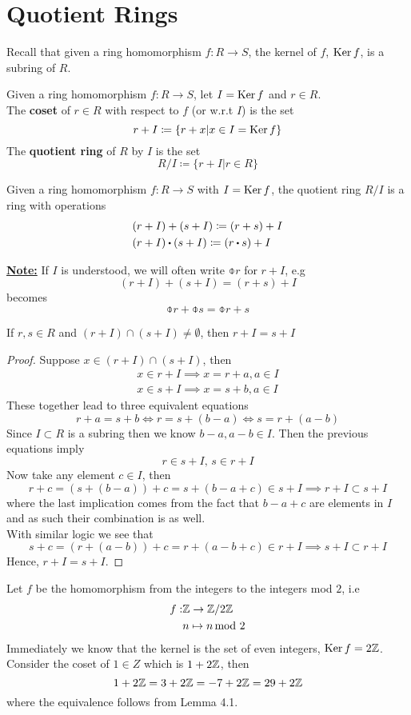 \documentclass[../Main.tex]{subfiles}
\begin{document}
\chapter{Quotient Rings}
Recall that given a ring homomorphism $f: R\to S$, the kernel of $f$, $\operatorname{Ker} f$, is a subring of $R$.
\begin{dfn}[title= Coset and Quotient Ring]
	Given a ring homomorphism $f:R\to S$, let $I= \operatorname{Ker} f$ and $r\in R$.\\
	The \textbf{coset} of $r \in R$ with respect to $f$ (or w.r.t $I$) is the set
	\[r+I \coloneqq \{r+x|x\in I = \operatorname{Ker} f\}\]
	The \textbf{quotient ring} of $R$ by $I$ is the set
	\[R/I\coloneqq \{r+I|r\in R\}\]
\end{dfn}
\begin{prop}[title= Coset space is a ring]
	Given a ring homomorphism $f: R \to S$ with $I = \operatorname{Ker} f$, the quotient ring $R/I$ is a ring with operations
	\begin{align*}
		&(r+I)+(s+I)\coloneqq (r+s)+I\\
		&(r+I)\rdot (s+I)\coloneqq (r\rdot s)+I
	\end{align*}
\end{prop}
\underline{\textbf{Note:}} If $I$ is understood, we will often write $\obar{r}$ for $r+I$, e.g
\[(r+I)+(s+I)=(r+s)+I\]
becomes
\[\obar{r}+\obar{s}=\obar{r+s}\]
\begin{lem}
	If $r,s\in R$ and $(r+I)\cap(s+I)\ne \emptyset$, then $r+I=s+I$
\end{lem}
\begin{proof}
	Suppose $x\in (r+I)\cap (s+I)$, then
	\begin{align*}
		x\in r+I \implies x = r+a, a\in I\\
		x\in s+I \implies x = s+b, a\in I
	\end{align*}
	These together lead to three equivalent equations
	\[r+a = s+b \Longleftrightarrow r=s+(b-a) \Longleftrightarrow s=r+(a-b)\]
	Since $I\subset R$ is a subring then we know $b-a,a-b\in I$. Then the previous equations imply
	\[r\in s+I,\, s\in r+I\]
	Now take any element $c\in I$, then
	\[r+c=(s+(b-a))+c=s+(b-a+c)\in s+I\implies r+I \subset s+I\]
	where the last implication comes from the fact that $b-a+c$ are elements in $I$ and as such their combination is as well.\\
	With similar logic we see that
	\[s+c=(r+(a-b))+c=r+(a-b+c) \in r+I \implies s+I \subset r+I\]
	Hence, $r+I=s+I$.
\end{proof}
\begin{example}
	Let $f$ be the homomorphism from the integers to the integers mod $2$, i.e
	\begin{align*}
		f:&\mathbb{Z} \to \mathbb{Z}/2\mathbb{Z} \\
		&n\mapsto n\,\text{mod }2 
	\end{align*}
	Immediately we know that the kernel is the set of even integers, $\operatorname{Ker} f = 2\mathbb{Z}$.\\
	Consider the coset of $1\in Z$ which is $1+2\mathbb{Z}$, then
	\[1+2\mathbb{Z} = 3+2\mathbb{Z} = -7+2\mathbb{Z} = 29+2\mathbb{Z}\]
	where the equivalence follows from Lemma 4.1.
\end{example}
\end{document}
